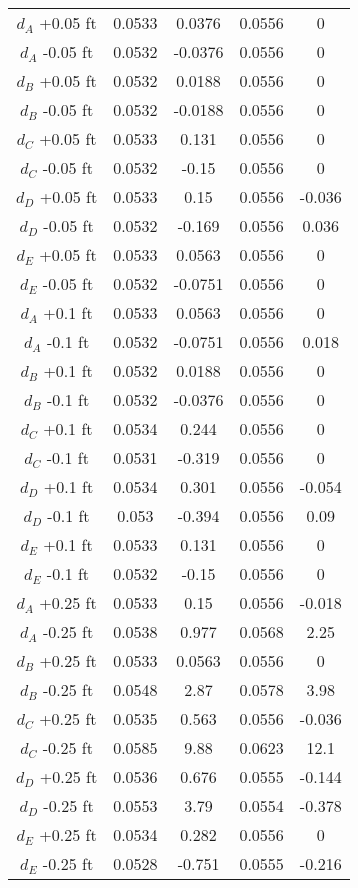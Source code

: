 \begin{linenumbers}
\begin{spacing}{1.0}
\begin{center}
\begin{longtable}{ccccc}
			$d_{A} $ +0.05 ft & 0.0533 & 0.0376 & 0.0556 & 0 \\
			$d_{A} $ -0.05 ft & 0.0532 & -0.0376 & 0.0556 & 0 \\
			$d_{B} $ +0.05 ft & 0.0532 & 0.0188 & 0.0556 & 0 \\
			$d_{B} $ -0.05 ft & 0.0532 & -0.0188 & 0.0556 & 0 \\
			$d_{C} $ +0.05 ft & 0.0533 & 0.131 & 0.0556 & 0 \\
			$d_{C} $ -0.05 ft & 0.0532 & -0.15 & 0.0556 & 0 \\
			$d_{D} $ +0.05 ft & 0.0533 & 0.15 & 0.0556 & -0.036 \\
			$d_{D} $ -0.05 ft & 0.0532 & -0.169 & 0.0556 & 0.036 \\
			$d_{E} $ +0.05 ft & 0.0533 & 0.0563 & 0.0556 & 0 \\
			$d_{E} $ -0.05 ft & 0.0532 & -0.0751 & 0.0556 & 0 \\
			$d_{A} $ +0.1 ft & 0.0533 & 0.0563 & 0.0556 & 0 \\
			$d_{A} $ -0.1 ft & 0.0532 & -0.0751 & 0.0556 & 0.018 \\
			$d_{B} $ +0.1 ft & 0.0532 & 0.0188 & 0.0556 & 0 \\
			$d_{B} $ -0.1 ft & 0.0532 & -0.0376 & 0.0556 & 0 \\
			$d_{C} $ +0.1 ft & 0.0534 & 0.244 & 0.0556 & 0 \\
			$d_{C} $ -0.1 ft & 0.0531 & -0.319 & 0.0556 & 0 \\
			$d_{D} $ +0.1 ft & 0.0534 & 0.301 & 0.0556 & -0.054 \\
			$d_{D} $ -0.1 ft & 0.053 & -0.394 & 0.0556 & 0.09 \\
			$d_{E} $ +0.1 ft & 0.0533 & 0.131 & 0.0556 & 0 \\
			$d_{E} $ -0.1 ft & 0.0532 & -0.15 & 0.0556 & 0 \\
			$d_{A} $ +0.25 ft & 0.0533 & 0.15 & 0.0556 & -0.018 \\
			$d_{A} $ -0.25 ft & 0.0538 & 0.977 & 0.0568 & 2.25 \\
			$d_{B} $ +0.25 ft & 0.0533 & 0.0563 & 0.0556 & 0 \\
			$d_{B} $ -0.25 ft & 0.0548 & 2.87 & 0.0578 & 3.98 \\
			$d_{C} $ +0.25 ft & 0.0535 & 0.563 & 0.0556 & -0.036 \\
			$d_{C} $ -0.25 ft & 0.0585 & 9.88 & 0.0623 & 12.1 \\
			$d_{D} $ +0.25 ft & 0.0536 & 0.676 & 0.0555 & -0.144 \\
			$d_{D} $ -0.25 ft & 0.0553 & 3.79 & 0.0554 & -0.378 \\
			$d_{E} $ +0.25 ft & 0.0534 & 0.282 & 0.0556 & 0 \\
			$d_{E} $ -0.25 ft & 0.0528 & -0.751 & 0.0555 & -0.216 \\
			\bottomrule
		\end{longtable}%
	\end{center}
\end{spacing}


\end{linenumbers}

